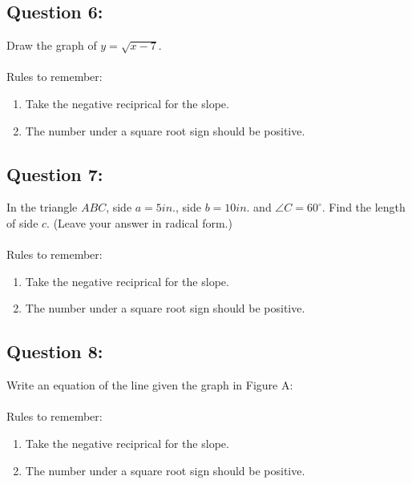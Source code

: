 \documentclass[12pt, letterpaper]{article}
\begin{document}

\subsection{Question 6:}
  Draw the graph of $y=\sqrt{x-7}$.
  \\\\

  Rules to remember:
  \begin{enumerate}
    \item Take the negative reciprical for the slope.
    \item The number under a square root sign should be positive.
  \end{enumerate}

\subsection{Question 7:}
  In the triangle $ABC$, side $a=5in.$, side $b=10in.$ and $\angle C=60^\circ$.
  Find the length of side $c$. (Leave your answer in radical form.) 
  \\\\
  Rules to remember:
  \begin{enumerate}
    \item Take the negative reciprical for the slope.
    \item The number under a square root sign should be positive.
  \end{enumerate}

\subsection{Question 8:}
  Write an equation of the line given the graph in Figure A:
  \\\\
  Rules to remember:
  \begin{enumerate}
    \item Take the negative reciprical for the slope.
    \item The number under a square root sign should be positive.
  \end{enumerate}
\end{document}
